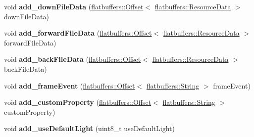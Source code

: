 \begin{DoxyCompactItemize}
\item 
\mbox{\label{structflatbuffers_1_1GameNode3DOptionBuilder_a2c7318b090906c2a078f7ad3d2f49c7c}} 
void {\bfseries add\+\_\+down\+File\+Data} (\hyperlink{structflatbuffers_1_1Offset}{flatbuffers\+::\+Offset}$<$ \hyperlink{structflatbuffers_1_1ResourceData}{flatbuffers\+::\+Resource\+Data} $>$ down\+File\+Data)
\item 
\mbox{\label{structflatbuffers_1_1GameNode3DOptionBuilder_a5a44a54f253146ffb3c91294d863a7e5}} 
void {\bfseries add\+\_\+forward\+File\+Data} (\hyperlink{structflatbuffers_1_1Offset}{flatbuffers\+::\+Offset}$<$ \hyperlink{structflatbuffers_1_1ResourceData}{flatbuffers\+::\+Resource\+Data} $>$ forward\+File\+Data)
\item 
\mbox{\label{structflatbuffers_1_1GameNode3DOptionBuilder_af8f7af65ac5d55d372fe86408815491e}} 
void {\bfseries add\+\_\+back\+File\+Data} (\hyperlink{structflatbuffers_1_1Offset}{flatbuffers\+::\+Offset}$<$ \hyperlink{structflatbuffers_1_1ResourceData}{flatbuffers\+::\+Resource\+Data} $>$ back\+File\+Data)
\item 
\mbox{\label{structflatbuffers_1_1GameNode3DOptionBuilder_aae4dc862d2fbb189bed33be2df4016f5}} 
void {\bfseries add\+\_\+frame\+Event} (\hyperlink{structflatbuffers_1_1Offset}{flatbuffers\+::\+Offset}$<$ \hyperlink{structflatbuffers_1_1String}{flatbuffers\+::\+String} $>$ frame\+Event)
\item 
\mbox{\label{structflatbuffers_1_1GameNode3DOptionBuilder_aa619e82aef1ea7df0e39c5adeecbcf4e}} 
void {\bfseries add\+\_\+custom\+Property} (\hyperlink{structflatbuffers_1_1Offset}{flatbuffers\+::\+Offset}$<$ \hyperlink{structflatbuffers_1_1String}{flatbuffers\+::\+String} $>$ custom\+Property)
\item 
\mbox{\label{structflatbuffers_1_1GameNode3DOptionBuilder_a5c650bcffbdc77047a3fc2f924017358}} 
void {\bfseries add\+\_\+use\+Default\+Light} (uint8\+\_\+t use\+Default\+Light)
\item 
\mbox{\label{structflatbuffers_1_1GameNode3DOptionBuilder_a21292d102663eb8325d150c126841de4}} 

\end{DoxyCompactItemize}
